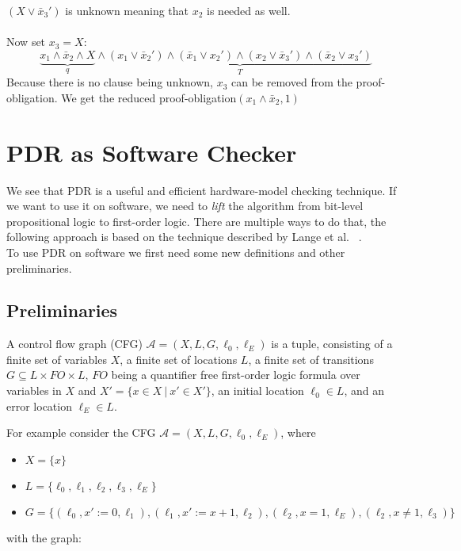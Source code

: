\documentclass[11pt, a4paper, BCOR=10mm, ngerman, oneside]{scrbook}
\begin{document}
$(X \lor \bar x_3')$ is unknown meaning that $x_2$  is needed as well. \\ \\

Now set $x_3 = X$: \\
\begin{equation*}
\underbrace{x_1 \land \bar x_2 \land X}_{q} \land \underbrace{(x_1 \lor \bar x_2' ) \land ( \bar x_1 \lor x_2') \land (x_2 \lor \bar x_3') \land ( \bar x_2 \lor x_3')}_{T}
\end{equation*}
Because there is no clause being unknown, $x_3$ can be removed from the proof-obligation. We get the reduced proof-obligation$(x_1 \land \bar x_2, 1)$

\pagebreak


\chapter{PDR as Software Checker} \label{sec3}
We see that PDR is a useful and efficient hardware-model checking technique. If we want to use it on software, we need to \textsl{lift} the algorithm from bit-level propositional logic to first-order logic. There are multiple ways to do that, the following approach is based on the technique described by Lange et al. ~\cite{DBLP:conf/fmcad/0001NN15}. \\ To use PDR on software we first need some new definitions and other preliminaries.

\section{Preliminaries}
A control flow graph (CFG) $\mathcal{A} = (X, L, G, \ell_0, \ell_E)$ is a tuple, consisting of a finite set of variables $X$, a finite set of locations $L$, a finite set of transitions $G \subseteq L \times FO \times L$, $FO$ being a quantifier free first-order logic formula over variables in $X$ and $X' = \{x \in X \ | \ x' \in X'\}$, an initial location $\ell_0 \in L$, and an error location $\ell_E \in L$.\par

For example consider the CFG $\mathcal{A} = (X, L, G, \ell_0, \ell_E)$, where
\begin{itemize}
\item $X = \{x\}$
\item $L = \{\ell_0, \ell_1, \ell_2, \ell_3, \ell_E\}$
\item $G = \{(\ell_0, x' := 0, \ell_1), (\ell_1, x' := x + 1, \ell_2), (\ell_2, x = 1, \ell_E), (\ell_2, x \neq 1, \ell_3) \} $
\end{itemize}
\pagebreak
with the graph: \\
\end{document}
